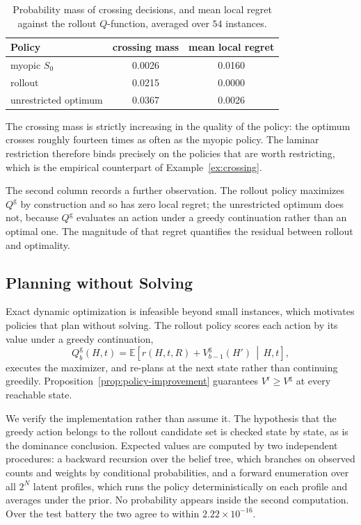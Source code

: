 \begin{table}[h]
\centering
\begin{tabular}{lcc}
\toprule
Policy & crossing mass & mean local regret \\
\midrule
myopic $S_0$ & 0.0026 & 0.0160 \\
rollout & 0.0215 & 0.0000 \\
unrestricted optimum & 0.0367 & 0.0026 \\
\bottomrule
\end{tabular}
\caption{Probability mass of crossing decisions, and mean local regret against
the rollout $Q$-function, averaged over $54$ instances.}
\label{tab:crossing}
\end{table}

The crossing mass is strictly increasing in the quality of the policy: the
optimum crosses roughly fourteen times as often as the myopic policy. The
laminar restriction therefore binds precisely on the policies that are worth
restricting, which is the empirical counterpart of Example~\ref{ex:crossing}.

The second column records a further observation. The rollout policy maximizes
$Q^{\mathrm{g}}$ by construction and so has zero local regret; the unrestricted
optimum does not, because $Q^{\mathrm{g}}$ evaluates an action under a greedy
continuation rather than an optimal one. The magnitude of that regret quantifies
the residual between rollout and optimality.

\subsection{Planning without Solving}
\label{sec:anatomy-rollout}

Exact dynamic optimization is infeasible beyond small instances, which motivates
policies that plan without solving. The rollout policy scores each action by its
value under a greedy continuation,
\[
  Q^{\mathrm{g}}_b(H,t)
  =\mathbb{E}\!\left[r(H,t,R)+V^{\mathrm{g}}_{b-1}(H')\,\middle|\,H,t\right],
\]
executes the maximizer, and re-plans at the next state rather than continuing
greedily. Proposition~\ref{prop:policy-improvement} guarantees
$V^{\mathrm{r}}\ge V^{\mathrm{g}}$ at every reachable state.

We verify the implementation rather than assume it. The hypothesis that the
greedy action belongs to the rollout candidate set is checked state by state,
as is the dominance conclusion. Expected values are computed by two independent
procedures: a backward recursion over the belief tree, which branches on
observed counts and weights by conditional probabilities, and a forward
enumeration over all $2^{N}$ latent profiles, which runs the policy
deterministically on each profile and averages under the prior. No probability
appears inside the second computation. Over the test battery the two agree to
within $2.22\times10^{-16}$.

